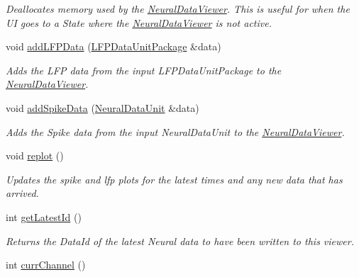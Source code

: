 \begin{DoxyCompactItemize}
\begin{DoxyCompactList}\small\item\em Deallocates memory used by the \hyperlink{class_neural_data_viewer}{Neural\-Data\-Viewer}. This is useful for when the U\-I goes to a State where the \hyperlink{class_neural_data_viewer}{Neural\-Data\-Viewer} is not active. \end{DoxyCompactList}\item 
void \hyperlink{class_neural_data_viewer_a33ce26232edaa58ba4400621fc0f1cb4}{add\-L\-F\-P\-Data} (\hyperlink{class_picto_1_1_l_f_p_data_unit_package}{L\-F\-P\-Data\-Unit\-Package} \&data)
\begin{DoxyCompactList}\small\item\em Adds the L\-F\-P data from the input L\-F\-P\-Data\-Unit\-Package to the \hyperlink{class_neural_data_viewer}{Neural\-Data\-Viewer}. \end{DoxyCompactList}\item 
void \hyperlink{class_neural_data_viewer_ab1e672e37e9902a1053996be1e60949f}{add\-Spike\-Data} (\hyperlink{class_picto_1_1_neural_data_unit}{Neural\-Data\-Unit} \&data)
\begin{DoxyCompactList}\small\item\em Adds the Spike data from the input Neural\-Data\-Unit to the \hyperlink{class_neural_data_viewer}{Neural\-Data\-Viewer}. \end{DoxyCompactList}\item 
void \hyperlink{class_neural_data_viewer_a4157c87495c85be09e6450f94642efd0}{replot} ()
\begin{DoxyCompactList}\small\item\em Updates the spike and lfp plots for the latest times and any new data that has arrived. \end{DoxyCompactList}\item 
\hypertarget{class_neural_data_viewer_a99a23b66072662768d5d213066bcd1a8}{int \hyperlink{class_neural_data_viewer_a99a23b66072662768d5d213066bcd1a8}{get\-Latest\-Id} ()}\label{class_neural_data_viewer_a99a23b66072662768d5d213066bcd1a8}

\begin{DoxyCompactList}\small\item\em Returns the Data\-Id of the latest Neural data to have been written to this viewer. \end{DoxyCompactList}\item 
\hypertarget{class_neural_data_viewer_ab1134a17a37625f981f297daf6d3233b}{int \hyperlink{class_neural_data_viewer_ab1134a17a37625f981f297daf6d3233b}{curr\-Channel} ()}\label{class_neural_data_viewer_ab1134a17a37625f981f297daf6d3233b}


\end{DoxyCompactItemize}
